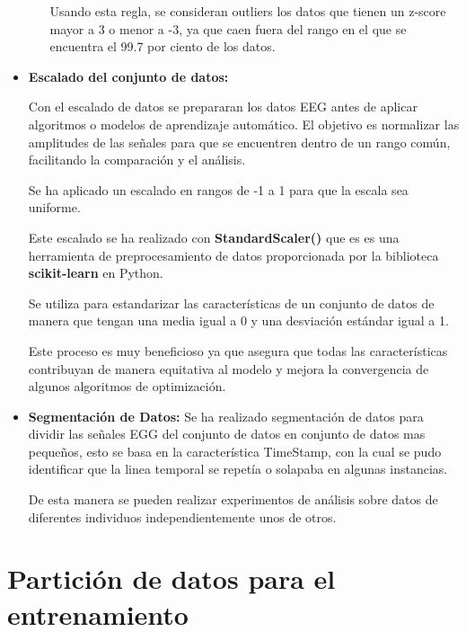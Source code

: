 \begin{itemize}
\begin{itemize}
Usando esta regla, se consideran outliers los datos que tienen un z-score mayor a 3 o menor a -3, ya que caen fuera del rango en el que se encuentra el 99.7 por ciento de los datos.



	\end{itemize}

	\item
	\textbf{Escalado del conjunto de datos:}
		
	Con el escalado de datos se prepararan los datos EEG antes de aplicar algoritmos o modelos de aprendizaje automático. El objetivo es normalizar las amplitudes de las señales para que se encuentren dentro de un rango común, facilitando la comparación y el análisis.

Se ha aplicado un escalado en rangos de -1 a 1 para que la escala sea uniforme.

Este escalado se ha realizado con \textbf{StandardScaler()} que es es una herramienta de preprocesamiento de datos proporcionada por la biblioteca \textbf{scikit-learn} en Python. 

Se utiliza para estandarizar las características de un conjunto de datos de manera que tengan una media igual a 0 y una desviación estándar igual a 1.

Este proceso es muy beneficioso ya que asegura que todas las características contribuyan de manera equitativa al modelo y mejora la convergencia de algunos algoritmos de optimización.



 
	\item
	\textbf{Segmentación de Datos:}	
	Se ha realizado segmentación de datos para dividir las señales EGG del conjunto de datos en conjunto de datos mas pequeños, esto se basa en la característica TimeStamp, con la cual se pudo identificar que la linea temporal se repetía o solapaba en algunas instancias. 
	
	De esta manera se pueden realizar experimentos de análisis sobre datos de diferentes individuos independientemente unos de otros.
	
	

\end{itemize}


\section{Partición de datos para el entrenamiento}

